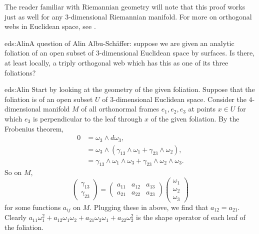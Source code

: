 The reader familiar with Riemannian geometry will note that this proof works just as well for any \(3\)-dimensional Riemannian manifold.
For more on orthogonal webs in Euclidean space, see \cite{Darboux:1993,DeTurck/Yang:1984,Terng/Uhlenbeck:1998,Zakharov:1998}.
\begin{problem*}{eds:Alin}A question of Alin Albu-Sch\"affer: suppose we are given an analytic foliation of an open subset of \(3\)-dimensional Euclidean space by surfaces.
Is there, at least locally, a triply orthogonal web which has this as one of its three foliations?%
\end{problem*}
\begin{answer}{eds:Alin}
Start by looking at the geometry of the given foliation.
Suppose that the foliation is of an open subset \(U\) of \(3\)-dimensional Euclidean space.
Consider the \(4\)-dimensional manifold \(M\) of all orthonormal frames \(e_1,e_2,e_3\) at points \(x\in U\) for which \(e_3\) is perpendicular to the leaf through \(x\) of the given foliation.
By the Frobenius theorem, 
\begin{align*}
0
&=\omega_3\wedge d\omega_3,
\\
&=\omega_3\wedge(\gamma_{13}\wedge\omega_1+\gamma_{23}\wedge\omega_2),
\\
&=
\gamma_{13}\wedge\omega_1\wedge\omega_3+\gamma_{23}\wedge\omega_2\wedge\omega_3.
\end{align*}
So on \(M\),
\[
\begin{pmatrix}
\gamma_{13}\\
\gamma_{23}
\end{pmatrix}
=
\begin{pmatrix}
a_{11}&a_{12}&a_{13}\\
a_{21}&a_{22}&a_{23}
\end{pmatrix}
\begin{pmatrix}
\omega_1\\
\omega_2\\
\omega_3
\end{pmatrix}
\]
for some functions \(a_{ij}\) on \(M\).
Plugging these in above, we find that \(a_{12}=a_{21}\).
Clearly \(a_{11}\omega_1^2+a_{12}\omega_1\omega_2+a_{21}\omega_2\omega_1+a_{22}\omega_2^2\) is the shape operator of each leaf of the foliation.


\end{answer}
